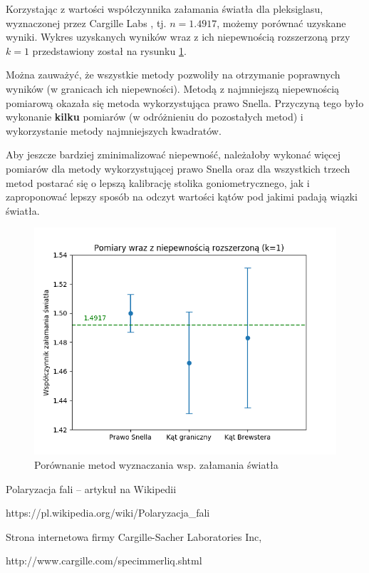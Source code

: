 \documentclass[a4paper]{article}
\begin{document}
Korzystając z wartości współczynnika załamania światła dla pleksiglasu, wyznaczonej przez Cargille Labs \cite{cargille}, tj. $n = 1.4917$, możemy porównać uzyskane wyniki.
Wykres uzyskanych wyników wraz z ich niepewnością rozszerzoną przy $k = 1$ przedstawiony został na rysunku \ref{wnioski-wykres}.

Można zauważyć, że wszystkie metody pozwoliły na otrzymanie poprawnych wyników (w granicach ich niepewności).
Metodą z najmniejszą niepewnością pomiarową okazała się metoda wykorzystująca prawo Snella.
Przyczyną tego było wykonanie \textbf{kilku} pomiarów (w odróżnieniu do pozostałych metod) i wykorzystanie metody najmniejszych kwadratów.

Aby jeszcze bardziej zminimalizować niepewność, należałoby wykonać więcej pomiarów dla metody wykorzystującej prawo Snella oraz dla wszystkich trzech metod postarać się o lepszą kalibrację stolika goniometrycznego, jak i zaproponować lepszy sposób na odczyt wartości kątów pod jakimi padają wiązki światła.

\begin{figure}
\centering
\includegraphics[scale=0.7]{wnioski.png}	
\caption{Porównanie metod wyznaczania wsp. załamania światła}
\label{wnioski-wykres}
\end{figure}




\begin{thebibliography}{9}

  Polaryzacja fali -- artykuł na Wikipedii
  
  https://pl.wikipedia.org/wiki/Polaryzacja\_fali

  Strona internetowa firmy Cargille-Sacher Laboratories Inc,
  
  http://www.cargille.com/specimmerliq.shtml


\end{thebibliography}
\end{document}
